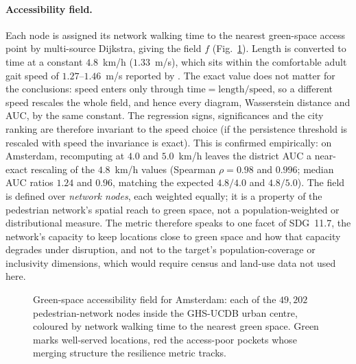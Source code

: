 \documentclass[sn-mathphys-num,pdflatex]{sn-jnl}
\begin{document}
\paragraph{Accessibility field.} Each node is assigned its network walking time to the
nearest green-space access point by multi-source Dijkstra, giving the field $f$
(Fig.~\ref{fig:accessfield}). Length is converted to time at a constant
$4.8$~km/h ($1.33$~m/s), which sits within the comfortable adult gait speed of
$1.27$--$1.46$~m/s reported by \citet{bohannon1997walking}. The exact value does not
matter for the conclusions: speed enters only through $\text{time}=\text{length}/
\text{speed}$, so a different speed rescales the whole field, and hence every
diagram, Wasserstein distance and AUC, by the same constant. The regression signs,
significances and the city ranking are therefore invariant to the speed choice (if
the persistence threshold is rescaled with speed the invariance is exact). This is
confirmed empirically: on Amsterdam, recomputing at $4.0$ and $5.0$~km/h leaves
the district AUC a near-exact rescaling of the $4.8$~km/h values (Spearman
$\rho=0.98$ and $0.996$; median AUC ratios $1.24$ and $0.96$, matching the expected
$4.8/4.0$ and $4.8/5.0$). The field is defined over \emph{network nodes}, each weighted equally;
it is a property of the pedestrian network's spatial reach to green space, not a
population-weighted or distributional measure. The metric therefore speaks to one
facet of SDG~11.7, the network's capacity to keep locations close to green space and
how that capacity degrades under disruption, and not to the target's
population-coverage or inclusivity dimensions, which would require census and
land-use data not used here.

\begin{figure}[t]\centering
{}
\caption{Green-space accessibility field for Amsterdam: each of the $49{,}202$
pedestrian-network nodes inside the GHS-UCDB urban centre, coloured by network
walking time to the nearest green space. Green marks well-served locations,
red the access-poor pockets whose merging structure the resilience metric tracks.}
\label{fig:accessfield}
\end{figure}
\end{document}
